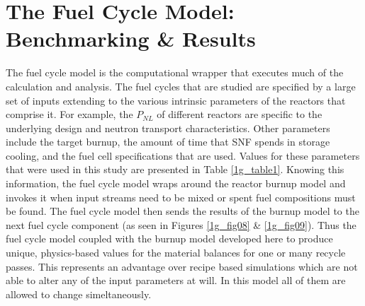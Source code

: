 \section{The Fuel Cycle Model: Benchmarking \& Results}
\label{1g_sec:fcmodel_benchmark}
The fuel cycle model is the computational wrapper that executes much of the calculation and analysis.  The fuel 
cycles that are studied are specified by a large set of inputs extending to the various intrinsic parameters of 
the reactors that comprise it.  For example, the $P_{NL}$ of different reactors are specific to the underlying
design and neutron transport characteristics.  Other parameters include the target burnup, the 
amount of time that SNF spends in storage cooling, and the fuel cell specifications that are used.  Values 
for these parameters that were used in this study are presented in Table \ref{1g_table1}.  Knowing this information, the 
fuel cycle model wraps around the reactor burnup model and invokes it when input streams need to be mixed 
or spent fuel compositions must be found.  The fuel cycle model then sends the results of the burnup model 
to the next fuel cycle component (as seen in Figures \ref{1g_fig08} \& \ref{1g_fig09}).  Thus the fuel cycle 
model coupled with the burnup model developed here to produce unique, physics-based values for the material 
balances for one or many recycle passes.  This represents an advantage over recipe based 
simulations which are not able to alter any of the input parameters at will.  In this model all of them are 
allowed to change simeltaneously. 

